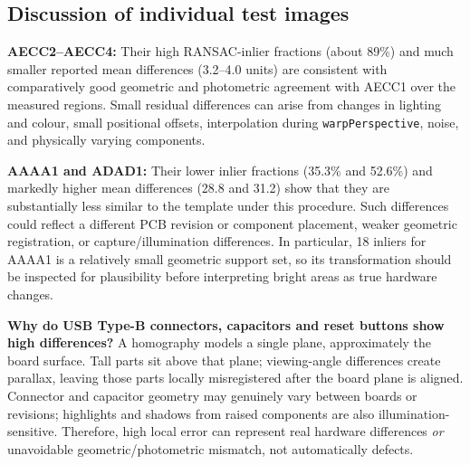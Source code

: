 \documentclass[11pt,a4paper]{article}
\begin{document}
\subsection{Discussion of individual test images}
\textbf{AECC2--AECC4:} Their high RANSAC-inlier fractions (about 89\%) and much smaller reported mean differences (3.2--4.0 units) are consistent with comparatively good geometric and photometric agreement with AECC1 over the measured regions. Small residual differences can arise from changes in lighting and colour, small positional offsets, interpolation during \texttt{warpPerspective}, noise, and physically varying components.

\textbf{AAAA1 and ADAD1:} Their lower inlier fractions (35.3\% and 52.6\%) and markedly higher mean differences (28.8 and 31.2) show that they are substantially less similar to the template under this procedure. Such differences could reflect a different PCB revision or component placement, weaker geometric registration, or capture/illumination differences. In particular, 18 inliers for AAAA1 is a relatively small geometric support set, so its transformation should be inspected for plausibility before interpreting bright areas as true hardware changes.

\textbf{Why do USB Type-B connectors, capacitors and reset buttons show high differences?} A homography models a single plane, approximately the board surface. Tall parts sit above that plane; viewing-angle differences create parallax, leaving those parts locally misregistered after the board plane is aligned. Connector and capacitor geometry may genuinely vary between boards or revisions; highlights and shadows from raised components are also illumination-sensitive. Therefore, high local error can represent real hardware differences \emph{or} unavoidable geometric/photometric mismatch, not automatically defects.
\end{document}
